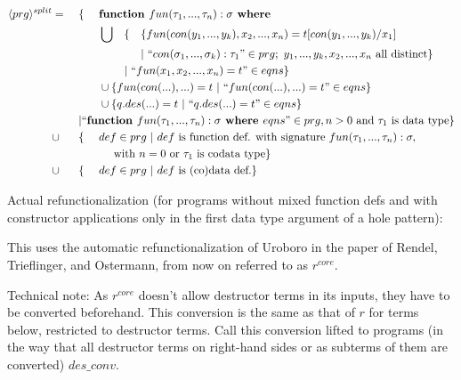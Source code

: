 \documentclass[11pt]{article} %
\begin{document}
\begin{alignat*}{5}
\langle prg \rangle^{split} & = ~&& \{ ~&& \textrm{\textbf{function }} fun(\tau_1, ..., \tau_n): \sigma \textrm{\textbf{ where }} \span\span\span\span \\
& && && \bigcup && \{ && \{ fun(con(y_1, ..., y_k), x_2, ..., x_n) = t[con(y_1, ..., y_k)/x_1] \\
& && && && && | ~ `` con(\sigma_1, ..., \sigma_k): \tau_1 " \in prg; ~ y_1, ..., y_k, x_2, ..., x_n \textrm{ all distinct} \} \\
& && && && | ~ `` fun(x_1, x_2, ..., x_n) = t " \in eqns \} \span\span \\
& && && \cup \{ fun(con(...), ...) = t ~ | ~ `` fun(con(...), ...) = t " \in eqns \} \span\span\span\span \\
& && && \cup \{ q.des(...) = t ~ | ~ `` q.des(...) = t " \in eqns \} \span\span\span\span \\
& && | `` \textrm{\textbf{function }} fun(\tau_1, ..., \tau_n): \sigma \textrm{\textbf{ where }} eqns " \in prg, n > 0 \textrm{ and } \tau_1 \textrm{ is data type} \} \span\span\span\span\span\span \\
& \cup && \{ && def \in prg ~ | ~ def \textrm{ is function def. with signature } fun(\tau_1, ..., \tau_n): \sigma, \span\span\span\span \\
& && &&\quad \textrm{ with } n = 0 \textrm{ or } \tau_1 \textrm{ is codata type} \} \span\span\span\span \\
& \cup && \{ && def \in prg ~ | ~ def \textrm{ is (co)data def.} \} \span\span\span\span
\end{alignat*}

Actual refunctionalization (for programs without mixed function defs and with constructor applications only in the first data type argument of a hole pattern):

This uses the automatic refunctionalization of Uroboro in the paper of Rendel, Trieflinger, and Ostermann, from now on referred to as $r^{core}$.

Technical note: As $r^{core}$ doesn't allow destructor terms in its inputs, they have to be converted beforehand. This conversion is the same as that of $r$ for terms below, restricted to destructor terms. Call this conversion lifted to programs (in the way that all destructor terms on right-hand sides or as subterms of them are converted) $des\_conv$.
\end{document}
